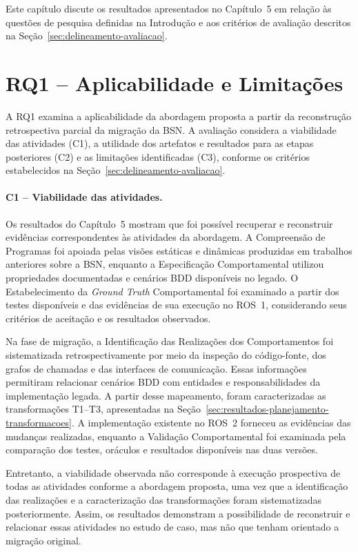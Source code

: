 \label{cap:avaliacao}

Este capítulo discute os resultados apresentados no Capítulo~5 em relação às questões de pesquisa definidas na Introdução e aos critérios de avaliação descritos na Seção~\ref{sec:delineamento-avaliacao}.

\section{RQ1 -- Aplicabilidade e Limitações}
\label{sec:avaliacao-rq1}

A RQ1 examina a aplicabilidade da abordagem proposta a partir da reconstrução retrospectiva parcial da migração da BSN. A avaliação considera a viabilidade das atividades (C1), a utilidade dos artefatos e resultados para as etapas posteriores (C2) e as limitações identificadas (C3), conforme os critérios estabelecidos na Seção~\ref{sec:delineamento-avaliacao}.

\paragraph{C1 -- Viabilidade das atividades.}

Os resultados do Capítulo~5 mostram que foi possível recuperar e reconstruir evidências correspondentes às atividades da abordagem. A Compreensão de Programas foi apoiada pelas visões estáticas e dinâmicas produzidas em trabalhos anteriores sobre a BSN, enquanto a Especificação Comportamental utilizou propriedades documentadas e cenários BDD disponíveis no legado. O Estabelecimento da \textit{Ground Truth} Comportamental foi examinado a partir dos testes disponíveis e das evidências de sua execução no ROS~1, considerando seus critérios de aceitação e os resultados observados.

Na fase de migração, a Identificação das Realizações dos Comportamentos foi sistematizada retrospectivamente por meio da inspeção do código-fonte, dos grafos de chamadas e das interfaces de comunicação. Essas informações permitiram relacionar cenários BDD com entidades e responsabilidades da implementação legada. A partir desse mapeamento, foram caracterizadas as transformações T1--T3, apresentadas na Seção~\ref{sec:resultados-planejamento-transformacoes}. A implementação existente no ROS~2 forneceu as evidências das mudanças realizadas, enquanto a Validação Comportamental foi examinada pela comparação dos testes, oráculos e resultados disponíveis nas duas versões.

Entretanto, a viabilidade observada não corresponde à execução prospectiva de todas as atividades conforme a abordagem proposta, uma vez que a identificação das realizações e a caracterização das transformações foram sistematizadas posteriormente. Assim, os resultados demonstram a possibilidade de reconstruir e relacionar essas atividades no estudo de caso, mas não que tenham orientado a migração original.

